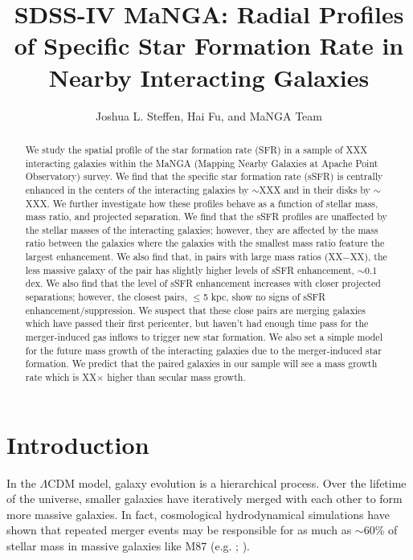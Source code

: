 \documentclass[iop,revtex4,twocolumn,apj,numberedappendix,appendixfloats]{emulateapj}
\begin{document}
\title{SDSS-IV MaNGA: Radial Profiles of Specific Star Formation Rate in Nearby Interacting Galaxies}

\author{
Joshua L. Steffen, 
Hai Fu, and 
MaNGA Team 
}

\begin{abstract}
We study the spatial profile of the star formation rate (SFR) in a sample of XXX interacting galaxies within the MaNGA (Mapping Nearby Galaxies at Apache Point Observatory) survey. We find that the specific star formation rate (sSFR) is centrally enhanced in the centers of the interacting galaxies by $\sim$XXX and in their disks by $\sim$XXX. We further investigate how these profiles behave as a function of stellar mass, mass ratio, and projected separation. We find that the sSFR profiles are unaffected by the stellar masses of the interacting galaxies; however, they are affected by the mass ratio between the galaxies where the galaxies with the smallest mass ratio feature the largest enhancement. We also find that, in pairs with large mass ratios (XX$-$XX), the less massive galaxy of the pair has slightly higher levels of sSFR enhancement, $\sim$0.1 dex. We also find that the level of sSFR enhancement increases with closer projected separations; however, the closest pairs, $\le$5 kpc, show no signs of sSFR enhancement/suppression. We suspect that these close pairs are merging galaxies which have passed their first pericenter, but haven't had enough time pass for the merger-induced gas inflows to trigger new star formation. We also set a simple model for the future mass growth of the interacting galaxies due to the merger-induced star formation. We predict that the paired galaxies in our sample will see a mass growth rate which is XX$\times$ higher than secular mass growth. 
\end{abstract}


\section{Introduction}\label{sec:intro}

In the $\Lambda$CDM model, galaxy evolution is a hierarchical process. Over the lifetime of the universe, smaller galaxies have iteratively merged with each other to form more massive galaxies. In fact, cosmological hydrodynamical simulations have shown that repeated merger events may be responsible for as much as $\sim$60\% of stellar mass in massive galaxies like M87 (e.g. \citet{Rodriguez-Gomez:2016}; \citet{Pillepich:2018}). 
\end{document}
